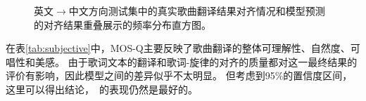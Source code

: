 \begin{figure}[ht]
    \centering
{}
\caption{英文$\rightarrow$中文方向测试集中的真实歌曲翻译结果对齐情况和模型预测的对齐结果重叠展示的频率分布直方图。}
\label{fig:align_hist2}
\end{figure}
在表\ref{tab:subjective}中，MOS-Q主要反映了歌曲翻译的整体可理解性、自然度、可唱性和美感。
由于歌词文本的翻译和歌词-旋律的对齐的质量都对这一最终结果的评价有影响，因此模型之间的差异似乎不太明显。
但考虑到95\%的置信度区间，这里可以得出结论，\modelname~的表现仍然是最好的。
